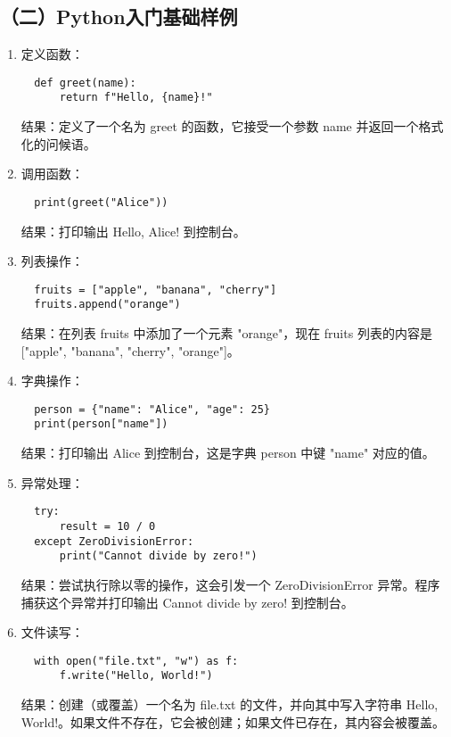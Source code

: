 \documentclass[UTF8]{ctexart}
\begin{document}
\subsection*{（二）Python入门基础样例}
\begin{enumerate}
  \item 定义函数：
  \begin{verbatim}
  def greet(name):
      return f"Hello, {name}!"
  \end{verbatim}
  结果：定义了一个名为 greet 的函数，它接受一个参数 name 并返回一个格式化的问候语。
  
  \item 调用函数：
  \begin{verbatim}
  print(greet("Alice"))
  \end{verbatim}
  结果：打印输出 Hello, Alice! 到控制台。
  
  \item 列表操作：
  \begin{verbatim}
  fruits = ["apple", "banana", "cherry"]
  fruits.append("orange")
  \end{verbatim}
  结果：在列表 fruits 中添加了一个元素 "orange"，现在 fruits 列表的内容是 ["apple", "banana", "cherry", "orange"]。
  
  \item 字典操作：
  \begin{verbatim}
  person = {"name": "Alice", "age": 25}
  print(person["name"])
  \end{verbatim}
  结果：打印输出 Alice 到控制台，这是字典 person 中键 "name" 对应的值。
  
  \item 异常处理：
  \begin{verbatim}
  try:
      result = 10 / 0
  except ZeroDivisionError:
      print("Cannot divide by zero!")
  \end{verbatim}
  结果：尝试执行除以零的操作，这会引发一个 ZeroDivisionError 异常。程序捕获这个异常并打印输出 Cannot divide by zero! 到控制台。
  
  \item 文件读写：
  \begin{verbatim}
  with open("file.txt", "w") as f:
      f.write("Hello, World!")
  \end{verbatim}
  结果：创建（或覆盖）一个名为 file.txt 的文件，并向其中写入字符串 Hello, World!。如果文件不存在，它会被创建；如果文件已存在，其内容会被覆盖。
\end{enumerate}
\end{document}
